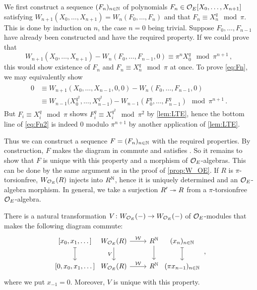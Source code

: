 \documentclass[a4paper, 10pt, oneside, DIV=9, chapterprefix=true, numbers=enddot,bibliography=totoc]{scrbook}
\begin{document}
\begin{proof*}
	We first construct a sequence $(F_n)_{n\in\mathbb{N}}$ of polynomials $F_n\in \mathcal{O}_E[X_0,\dotsc,X_{n+1}]$ satisfying $W_{n+1}(X_0,\dotsc,X_{n+1})=W_n(F_0,\dotsc,F_n)$ and that $F_n\equiv X_n^q\mod \pi$. This is done by induction on $n$, the case $n=0$ being trivial. Suppose $F_0,\dotsc,F_{n-1}$ have already been constructed and have the required property. If we could prove that
	\begin{equation}\label{eq:Fn}
		W_{n+1}(X_0,\dotsc,X_{n+1})-W_n(F_0,\dotsc,F_{n-1},0)\equiv \pi^n X_0^q\mod \pi^{n+1}\,,
	\end{equation}
	this would show existence of $F_n$ and $F_n\equiv X_n^q\mod \pi$ at once. To prove \cref{eq:Fn}, we may equivalently show
	\begin{align}\label{eq:Fn2}
		\begin{split}
			0&\equiv W_{n+1}(X_0,\dotsc,X_{n-1},0,0)-W_n(F_0,\dotsc,F_{n-1},0)\\
			&\equiv W_{n-1}\big(X_0^{q^2},\dotsc,X_{n-1}^{q^2}\big)-W_{n-1}\left(F_0^q,\dotsc,F_{n-1}^q\right)\mod \pi^{n+1}\,.
		\end{split}
	\end{align}
	But $F_i\equiv X_i^q\mod \pi$ shows $F_i^q\equiv X_i^{q^2}\mod \pi^2$ by \cref{lem:LTE}, hence the bottom line of \cref{eq:Fn2} is indeed $0$ modulo $\pi^{n+1}$ by another application of \cref{lem:LTE}.
	
	Thus we can construct a sequence $F=(F_n)_{n\in \mathbb{N}}$ with the required properties. By construction, $F$ makes the diagram in  commute and satisfies . So it remains to show that $F$ is unique with this property and a morphism of $\mathcal{O}_E$-algebras. This can be done by the same argument as in the proof of \cref{prop:W_OE}. If $R$ is $\pi$-torsionfree, $W_{\mathcal{O}_E}(R)$ injects into $R^{\mathbb{N}}$, hence it is uniquely determined and an $\mathcal{O}_E$-algebra morphism. In general, we take a surjection $R'\epimorphism R$ from a $\pi$-torsionfree $\mathcal{O}_E$-algebra.
\end{proof*}
\begin{lem}
	There is a natural transformation $V\colon W_{\Oo_E}(-)\morphism W_{\Oo_E}(-)$ of $\mathcal{O}_E$-modules that makes the following diagram commute:
	\begin{equation*}
		\begin{tikzcd}
			{[x_0,x_1,\dotsc]}\dar[|->] &[-2.4em] W_{\Oo_E}(R)\dar["V"{swap}]\rar["\Ww"] & R^\IN\dar &[-2.4em] (x_n)_{n\in\IN}\dar[|->]\\
			{[0,x_0,x_1,\dotsc]} &[-2.4em] W_{\Oo_E}(R) \rar["\Ww"] & R^\IN &[-2.4em] (\pi x_{n-1})_{n\in\IN}
		\end{tikzcd}\,,
	\end{equation*}
	where we put $x_{-1}=0$. Moreover, $V$ is unique with this property.
\end{lem}
\end{document}
